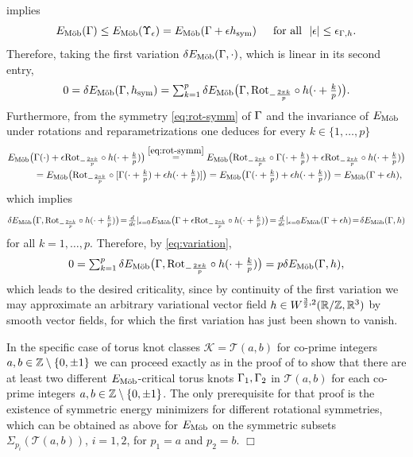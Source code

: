 implies
$$
{E_\textnormal{M\"ob}}(\Gamma)\le
{E_\textnormal{M\"ob}}(\Upsilon_\epsilon)=
{E_\textnormal{M\"ob}}(\Gamma+\epsilon h_\textnormal{sym})\quad\,\,\,\text{for all }\,\, |\epsilon|\le\epsilon_{\Gamma,h}.
$$
Therefore, taking the first variation $\delta{E_\textnormal{M\"ob}}(\Gamma,\cdot)$, which is linear in 
its second entry,
\begin{equation}\label{eq:variation}
\textstyle
0=\delta{E_\textnormal{M\"ob}}(\Gamma,h_\textnormal{sym})=\sum_{k=1}^p\delta{E_\textnormal{M\"ob}}\big(\Gamma,
{\textnormal{Rot}}_{-\frac{2\pi k}p}\circ h (\cdot +\frac{k}p)\big).
\end{equation}
Furthermore, from the symmetry \eqref{eq:rot-symm}
of $\Gamma$ and the invariance of ${E_\textnormal{M\"ob}}$ under
rotations and reparametrizations one deduces 
for every $k\in\{1,\ldots,p\}$
\begin{align*}
\textstyle
{E_\textnormal{M\"ob}}\big(&\textstyle\Gamma(\cdot)+\epsilon{\textnormal{Rot}}_{-\frac{2\pi k}p}\circ h(\cdot+\frac{k}p)\big)
\overset{\eqref{eq:rot-symm}}{=}
\textstyle
{E_\textnormal{M\"ob}}\big({\textnormal{Rot}}_{-\frac{2\pi k}p}\circ\Gamma(\cdot +\frac{k}p)
+\epsilon{\textnormal{Rot}}_{-\frac{2\pi k}p}\circ h(\cdot+\frac{k}p)\big)\\
& \textstyle
={E_\textnormal{M\"ob}}\big({\textnormal{Rot}}_{-\frac{2\pi k}p}\circ [\Gamma(\cdot +\frac{k}p)+\epsilon
h(\cdot+\frac{k}p)]\big)=
{E_\textnormal{M\"ob}}\big(\Gamma(\cdot +\frac{k}p)+\epsilon
h(\cdot+\frac{k}p)\big)={E_\textnormal{M\"ob}}(\Gamma+\epsilon h),
\end{align*}
which implies 
$$
\textstyle
\delta{E_\textnormal{M\"ob}}\big(\Gamma,{\textnormal{Rot}}_{-\frac{2\pi k}p}\circ h(\cdot +
\frac{k}p)\big)
\!=\!\frac{d}{d\epsilon} |_{\epsilon=0}
{E_\textnormal{M\"ob}}\big(\Gamma+\epsilon{\textnormal{Rot}}_{-\frac{2\pi k}p}\circ h(\cdot +\frac{k}p)
\big)\!=\!
\frac{d}{d\epsilon} |_{\epsilon=0}
{E_\textnormal{M\"ob}}(\Gamma+\epsilon h)\!=\!\delta{E_\textnormal{M\"ob}}(\Gamma,h)
$$
for all $k=1,\ldots,p$.
Therefore, by \eqref{eq:variation},
$$
\textstyle
0=\sum_{k=1}^p\delta{E_\textnormal{M\"ob}}\big(\Gamma,{\textnormal{Rot}}_{-\frac{2\pi k}p}\circ h(
\cdot +\frac{k}p)\big)=p\delta{E_\textnormal{M\"ob}}(\Gamma,h),
$$
which leads to the desired criticality, since by continuity of the first variation
we may approximate an arbitrary variational vector field $h\in W^{\frac32,2}(
\mathbb{R}/\mathbb{Z},\mathbb{R}^3)$ by smooth vector fields, for which the first variation
has just been shown to vanish.

In the specific case of torus knot classes $\mathcal{K}=\mathcal{T}(a,b)$
for co-prime integers $a,b\in\mathbb{Z}\setminus\{0,\pm 1\}$ we can proceed
exactly as in the proof of \cite[Theorem~1.2]{gilsbach-vdm_2018}
to show that there
are at least two different ${E_\textnormal{M\"ob}}$-critical torus knots
$\Gamma_1,\Gamma_2$ in $\mathcal{T}(a,b)$ for each 
co-prime integers $a,b\in\mathbb{Z}\setminus\{0,\pm 1\}$. The only prerequisite
for that proof is the existence of symmetric energy
minimizers for different
rotational symmetries, which can be  obtained as above for ${E_\textnormal{M\"ob}}$ on 
the symmetric subsets
$\Sigma_{p_i}(\mathcal{T}(a,b))$, $i=1,2$, for $p_1=a$ and $p_2=b$.
\hfill $\Box$

